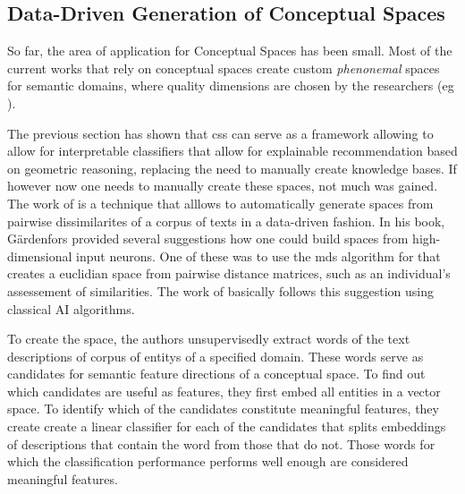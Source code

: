 
\subsection{Data-Driven Generation of Conceptual Spaces}

So far, the area of application for Conceptual Spaces has been small. Most of the current works that rely on conceptual spaces create custom \textit{phenonemal} spaces for semantic domains, where quality dimensions are chosen by the researchers (eg \cite{Schockaert2011}). 

The previous section has shown that \glspl{cs} can serve as a framework allowing to allow for interpretable classifiers that allow for explainable recommendation based on geometric reasoning, replacing the need to manually create knowledge bases. If however now one needs to manually create these spaces, not much was gained. The work of \cite{Derrac2015} is a technique that alllows to automatically generate spaces from pairwise dissimilarites of a corpus of texts in a data-driven fashion. In his book, Gärdenfors provided several suggestions how one could build spaces from high-dimensional input neurons. One of these was to use the \gls{mds} algorithm for that creates a euclidian space from pairwise distance matrices, such as an individual's assessement of similarities. The work of \cite{Derrac2015} basically follows this suggestion using classical AI algorithms. %

To create the space, the authors unsupervisedly extract words of the text descriptions of corpus of \glspl{entity} of a specified domain. These words serve as candidates for semantic feature directions of a conceptual space. To find out which candidates are useful as features, they first embed all entities in a vector space. To identify which of the candidates constitute meaningful features, they create create a linear classifier for each of the candidates that splits embeddings of descriptions that contain the word from those that do not. Those words for which the classification performance performs well enough are considered meaningful features.  

